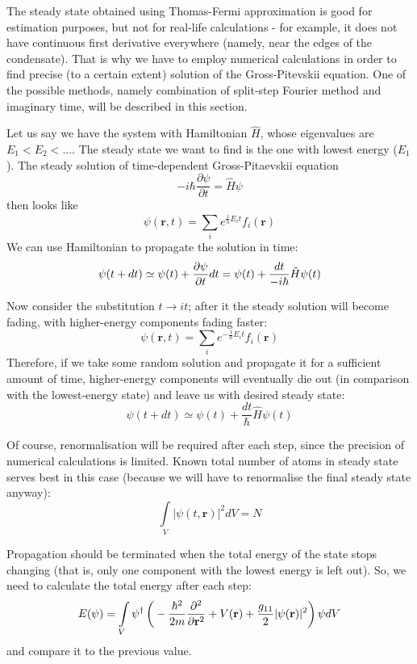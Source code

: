 \documentclass[12pt,notitlepage]{report}
\author{Bogdan Opanchuk}
\begin{document}
The steady state obtained using Thomas-Fermi approximation is good for estimation purposes, but not for
real-life calculations - for example, it does not have continuous first derivative everywhere (namely,
near the edges of the condensate). That is why we have to employ numerical calculations in order
to find precise (to a certain extent) solution of the Gross-Pitevskii equation. One of the possible methods, 
namely combination of split-step Fourier method and imaginary time, will be described in this section.

Let us say we have the system with Hamiltonian $\hat{H}$, whose eigenvalues are $E_1 < E_2 < ...$.
The steady state we want to find is the one with lowest energy ($E_1$). The steady solution of time-dependent
Gross-Pitaevskii equation
\[ -i \hbar \frac{\partial \psi}{\partial t} = \hat{H} \psi \]
then looks like
\[ \psi(\mathbf{r}, t) = \sum_i e^{\frac{i}{h} E_i t} f_i(\mathbf{r}) \]
We can use Hamiltonian to propagate the solution in time:
\[ 
\psi(t + dt) \simeq \psi(t) + \frac{\partial \psi}{\partial t} dt = \\
\psi(t) + \frac{dt}{-i \hbar} \hat{H} \psi(t)
\]

Now consider the substitution $t \rightarrow it$; after it the steady solution will become fading, with
higher-energy components fading faster:
\[ \psi(\mathbf{r}, t) = \sum_i e^{- \frac{1}{h} E_i t} f_i(\mathbf{r}) \]
Therefore, if we take some random solution and propagate it for a sufficient amount of time, higher-energy
components will eventually die out (in comparison with the lowest-energy state) and leave us with desired 
steady state:
\[ \psi(t + dt) \simeq \psi(t) + \frac{dt}{\hbar} \hat{H} \psi(t)\]

Of course, renormalisation will be required after each step, since the precision of numerical calculations is limited.
Known total number of atoms in steady state serves best in this case (because we will have to renormalise the
final steady state anyway):
\[ \int\limits_V \vert \psi(t, \mathbf{r}) \vert^2 dV = N \]

Propagation should be terminated when the total energy of the state stops changing (that is, only one component
with the lowest energy is left out). So, we need to calculate the total energy after each step:
\[ E(\psi) = \int\limits_V \psi^\dagger \left( \\
-\frac{\hbar^2}{2m} \frac{\partial^2}{\partial \mathbf{r}^2} + V(\mathbf{r}) + \\
\frac{g_{11}}{2} \vert \psi(\mathbf{r}) \vert^2 \right) \psi dV \]
and compare it to the previous value.
\end{document}
